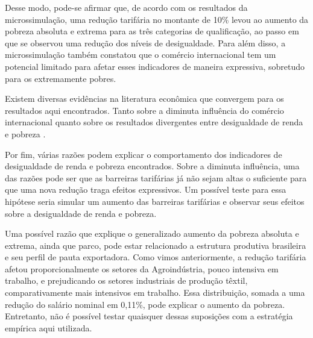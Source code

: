 Desse modo, pode-se afirmar que, de acordo com os resultados da microssimulação, uma redução tarifária no montante de 10\% levou ao aumento da pobreza absoluta e extrema para as três categorias de qualificação, ao passo em que se observou uma redução dos níveis de desigualdade. Para além disso, a microssimulação também constatou que o comércio internacional tem um potencial limitado para afetar esses indicadores de maneira expressiva, sobretudo para os extremamente pobres.

Existem diversas evidências na literatura econômica que convergem para os resultados aqui encontrados. Tanto sobre a diminuta influência do comércio internacional \cite{carneiro06} quanto sobre os resultados divergentes entre desigualdade de renda e pobreza \cite{borrazetal12}.

Por fim, várias razões podem explicar o comportamento dos indicadores de desigualdade de renda e pobreza encontrados. Sobre a diminuta influência, uma das razões pode ser que as barreiras tarifárias já não sejam altas o suficiente para que uma nova redução traga efeitos expressivos. Um possível teste para essa hipótese seria simular um aumento das barreiras tarifárias e observar seus efeitos sobre a desigualdade de renda e pobreza.

Uma possível razão que explique o generalizado aumento da pobreza absoluta e extrema, ainda que parco, pode estar relacionado a estrutura produtiva brasileira e seu perfil de pauta exportadora. Como vimos anteriormente, a redução tarifária afetou proporcionalmente os setores da Agroindústria, pouco intensiva em trabalho, e prejudicando os setores industriais de produção têxtil, comparativamente mais intensivos em trabalho. Essa distribuição, somada a uma redução do salário nominal em 0,11\%, pode explicar o aumento da pobreza. Entretanto, não é possível testar quaisquer dessas suposições com a estratégia empírica aqui utilizada.


